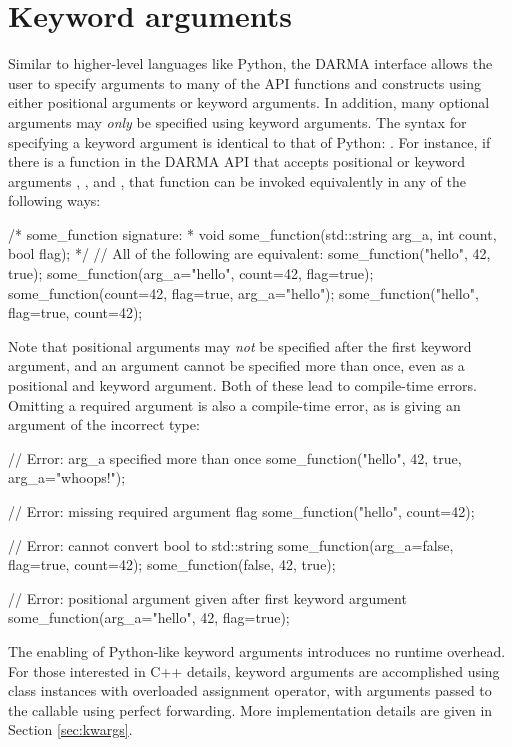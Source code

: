\section{Keyword arguments}
\label{sec:keyword}
Similar to higher-level languages like Python, the DARMA \CC{} interface allows the user
to specify arguments to many of the \gls{API} functions and constructs using
either \glspl{positional argument}
or \glspl{keyword argument}. In addition, many optional arguments may {\em only} be specified using
\glspl{keyword argument}. The syntax for specifying a \gls{keyword argument} is identical to that
of Python: .  For instance, if there is 
a function  in the DARMA \gls{API} that accepts 
positional or \glspl{keyword argument} , 
, and , that function can be invoked 
equivalently in any of the following ways:
\begin{CppCode}
/* some_function signature:
 *  void some_function(std::string arg_a, int count, bool flag);
 */
// All of the following are equivalent:
some_function("hello", 42, true);
some_function(arg_a="hello", count=42, flag=true);
some_function(count=42, flag=true, arg_a="hello");
some_function("hello", flag=true, count=42);
\end{CppCode}
Note that \glspl{positional argument} may {\em not} be specified after the
first \gls{keyword argument},
and an argument cannot be specified more than once, even as a positional and
\gls{keyword argument}.  Both of these lead to compile-time errors. Omitting a required argument is 
also a compile-time error, as is giving an argument of the incorrect type: 
\begin{CppCode}
// Error: arg_a specified more than once
some_function("hello", 42, true, arg_a="whoops!");

// Error: missing required argument flag
some_function("hello", count=42);

// Error: cannot convert bool to std::string
some_function(arg_a=false, flag=true, count=42);
some_function(false, 42, true);

// Error: positional argument given after first keyword argument
some_function(arg_a="hello", 42, flag=true);
\end{CppCode}
The enabling of Python-like keyword arguments introduces no runtime overhead.
For those interested in C++ details, keyword arguments are accomplished using
 class instances with overloaded assignment operator,
with arguments passed to the callable using perfect forwarding.
More implementation details are given in Section \ref{sec:kwargs}.  

